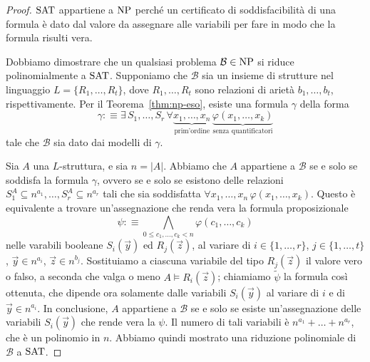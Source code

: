 \begin{proof}
  $\operatorname{SAT}$ appartiene a $\operatorname{NP}$ perché un certificato di soddisfacibilità di una formula è dato dal valore da assegnare alle variabili per fare in modo che la formula risulti vera.
  
  Dobbiamo dimostrare che un qualsiasi problema $\mathcal{B}\in\operatorname{NP}$ si riduce polinomialmente a $\operatorname{SAT}$.
  Supponiamo che $\mathcal{B}$ sia un insieme di strutture nel linguaggio $L=\{R_1,\dots,R_t\}$, dove $R_1,\dots,R_t$ sono relazioni di arietà $b_1,\dots,b_t$, rispettivamente.
  Per il Teorema~\ref{thm:np-eso}, esiste una formula $\gamma$ della forma
  \[ \gamma :\equiv \exists\, S_1,\dots,S_r \, \forall \underbrace{x_1,\dots,x_n}_{\text{prim'ordine}} \, \underbrace{\varphi(x_1,\dots,x_k)}_{\text{senza quantificatori}} \]
  tale che $\mathcal{B}$ sia dato dai modelli di $\gamma$.
  
  Sia $A$ una $L$-struttura, e sia $n=|A|$. Abbiamo che $A$ appartiene a $\mathcal{B}$ se e solo se soddisfa la formula $\gamma$, ovvero se e solo se esistono delle relazioni $S_1^A\subseteq n^{a_1}, \dots, S_r^A\subseteq n^{a_r}$ tali che sia soddisfatta $\forall x_1,\dots,x_n \,\varphi(x_1,\dots,x_k)$.
  Questo è equivalente a trovare un'assegnazione che renda vera la formula proposizionale
  \[ \psi :\equiv \bigwedge_{0\leq c_1,\dots,c_k < n} \varphi(c_1,\dots,c_k) \]
  nelle varabili booleane $S_i(\vec{y})$ ed $R_j(\vec{z})$, al variare di $i\in \{1,\ldots,r\}$, $j\in\{1,\dots,t\}$, $\vec{y}\in n^{a_i}$, $\vec{z}\in n^{b_j}$.
  Sostituiamo a ciascuna variabile del tipo $R_j(\vec{z})$ il valore vero o falso, a seconda che valga o meno $A \models R_i(\vec{z})$; chiamiamo $\tilde\psi$ la formula così ottenuta, che dipende ora solamente dalle variabili $S_i(\vec{y})$ al variare di $i$ e di $\vec{y}\in n^{a_i}$.
  In conclusione, $A$ appartiene a $\mathcal{B}$ se e solo se esiste un'assegnazione delle variabili $S_i(\vec{y})$ che rende vera la $\psi$. Il numero di tali variabili è $n^{a_1}+\ldots+n^{a_r}$, che è un polinomio in $n$.
  Abbiamo quindi mostrato una riduzione polinomiale di $\mathcal{B}$ a $\operatorname{SAT}$.
\end{proof}




